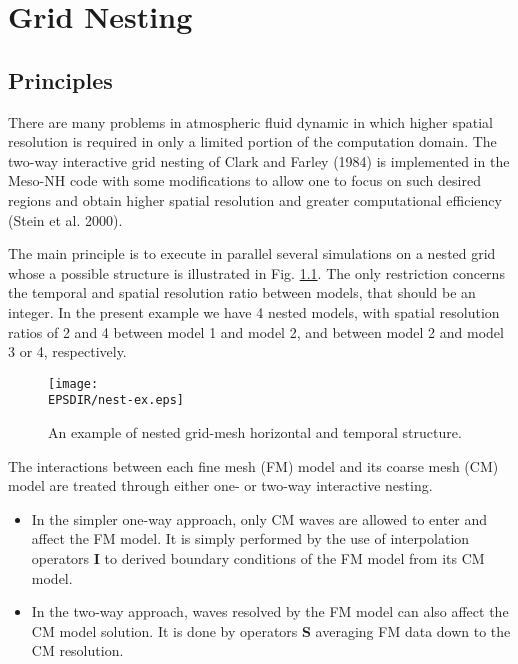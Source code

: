 
\chapter{Grid Nesting}
\minitoc

\section{Principles}

 There are many problems in atmospheric fluid dynamic in which higher spatial
resolution is required in only a limited portion of the computation domain.
 The two-way interactive grid nesting of Clark and Farley (1984)
is implemented in the Meso-NH code with some modifications
to allow one to focus on such desired regions and obtain higher
spatial resolution and greater computational efficiency (Stein et al. 2000).

 The main principle is to execute in parallel several simulations on a nested
grid whose a possible structure is illustrated in Fig. \ref{nesting-example}.
The only restriction concerns the temporal and spatial resolution ratio between
models, that should be an integer. In the present example we have 4 nested models,
with spatial resolution ratios of 2 and 4 between model 1 and model 2, and
between model 2 and model 3 or 4, respectively.


\begin{figure}[!ht]
\centerline{\texttt{[image: \\EPSDIR/nest-ex.eps]}}
\caption{An example of nested grid-mesh horizontal and temporal structure.}
\label{nesting-example}
\end{figure}

The interactions between each fine mesh (FM) model
and its coarse mesh (CM) model are treated through either
one- or two-way interactive nesting.


\begin{itemize}
\item
In the simpler one-way approach, only CM waves are allowed to enter and affect
the FM model. It is simply performed by the use of interpolation operators
{\bf I} to derived boundary conditions of the FM model from its CM model.
\item
 In the two-way approach, waves resolved by the FM model can also affect
the CM model solution. It is done by operators {\bf S} averaging
FM data down to the CM resolution.
\end{itemize}


